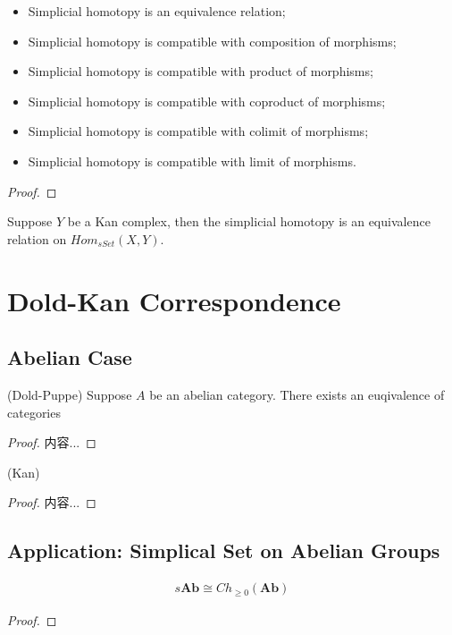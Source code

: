 \documentclass[Total.tex]{subfiles}
\begin{document}
		\begin{proposition}
			\begin{itemize}
				\item Simplicial homotopy is an equivalence relation;
				\item Simplicial homotopy is compatible with composition of morphisms;
				\item Simplicial homotopy is compatible with product of morphisms;
				\item Simplicial homotopy is compatible with coproduct of morphisms;
				\item Simplicial homotopy is compatible with colimit of morphisms;
				\item Simplicial homotopy is compatible with limit of morphisms.
			\end{itemize}
		\end{proposition}
		\begin{proof}
			
		\end{proof}
		\begin{proposition}
			Suppose $Y$ be a Kan complex, then the simplicial homotopy is an equivalence relation on $Hom_{sSet}(X,Y)$.
		\end{proposition}
		\section{Dold-Kan Correspondence}
			\subsection{Abelian Case}
				\begin{theorem}
					(Dold-Puppe) Suppose $A$ be an abelian category. There exists an euqivalence of categories
					\begin{center}
					\end{center}
				\end{theorem}
				\begin{proof}
					内容...
				\end{proof}
				
				\begin{theorem}
					(Kan)
				\end{theorem}
				\begin{proof}
					内容...
				\end{proof}
			\subsection{Application: Simplical Set on Abelian Groups}
			\begin{corollary}
				\begin{gather*}
					s\mathbf{Ab}\cong Ch_{\geq 0}(\mathbf{Ab})
				\end{gather*}
			\end{corollary}
			\begin{proof}
				
			\end{proof}
\end{document}
